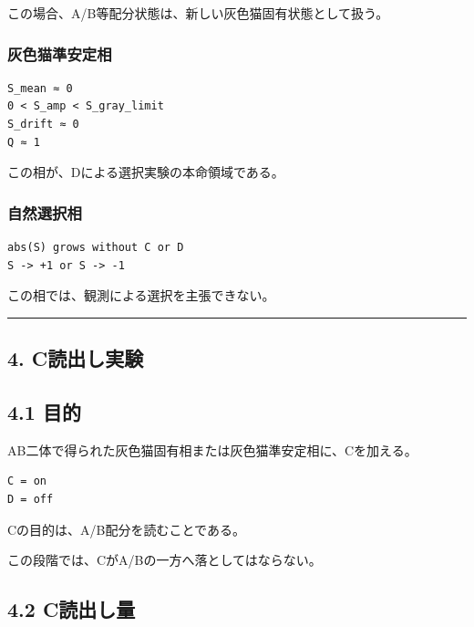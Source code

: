 \documentclass{article}
\begin{document}
この場合、A/B等配分状態は、新しい灰色猫固有状態として扱う。

\subsubsection{灰色猫準安定相}\label{ux7070ux8272ux732bux6e96ux5b89ux5b9aux76f8}

\begin{verbatim}
S_mean ≈ 0
0 < S_amp < S_gray_limit
S_drift ≈ 0
Q ≈ 1
\end{verbatim}

この相が、Dによる選択実験の本命領域である。

\subsubsection{自然選択相}\label{ux81eaux7136ux9078ux629eux76f8}

\begin{verbatim}
abs(S) grows without C or D
S -> +1 or S -> -1
\end{verbatim}

この相では、観測による選択を主張できない。

\begin{center}\rule{0.5\linewidth}{0.5pt}\end{center}

\subsection{4. C読出し実験}\label{cux8aadux51faux3057ux5b9fux9a13}

\subsection{4.1 目的}\label{ux76eeux7684-2}

AB二体で得られた灰色猫固有相または灰色猫準安定相に、Cを加える。

\begin{verbatim}
C = on
D = off
\end{verbatim}

Cの目的は、A/B配分を読むことである。

この段階では、CがA/Bの一方へ落としてはならない。

\subsection{4.2 C読出し量}\label{cux8aadux51faux3057ux91cf}
\end{document}
